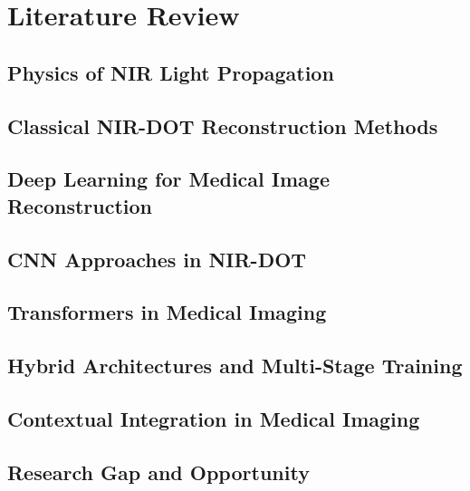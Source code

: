 
\chapter{Literature Review}

\section{Physics of NIR Light Propagation}

\section{Classical NIR-DOT Reconstruction Methods}

\section{Deep Learning for Medical Image Reconstruction}

\section{CNN Approaches in NIR-DOT}

\section{Transformers in Medical Imaging}

\section{Hybrid Architectures and Multi-Stage Training}

\section{Contextual Integration in Medical Imaging}

\section{Research Gap and Opportunity}

